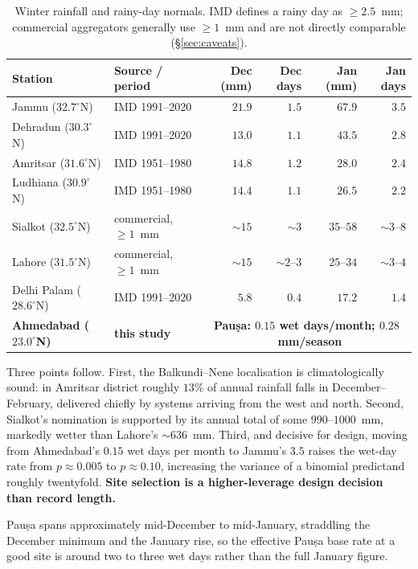\documentclass[11pt,a4paper]{article}
\begin{document}
\begin{table}[H]\centering\small
\caption{Winter rainfall and rainy-day normals. IMD defines a rainy day as $\ge2.5$~mm; commercial aggregators generally use $\ge1$~mm and are not directly comparable (\S\ref{sec:caveats}).}
\label{tab:base}
\begin{tabular}{llrrrr}
\toprule
Station & Source / period & Dec (mm) & Dec days & Jan (mm) & Jan days\\
\midrule
Jammu ($32.7^\circ$N) & IMD 1991--2020 & $21.9$ & $1.5$ & $67.9$ & $\mathbf{3.5}$\\
Dehradun ($30.3^\circ$N) & IMD 1991--2020 & $13.0$ & $1.1$ & $43.5$ & $2.8$\\
Amritsar ($31.6^\circ$N) & IMD 1951--1980 & $14.8$ & $1.2$ & $28.0$ & $2.4$\\
Ludhiana ($30.9^\circ$N) & IMD 1951--1980 & $14.4$ & $1.1$ & $26.5$ & $2.2$\\
Sialkot ($32.5^\circ$N) & commercial, $\ge1$~mm & $\sim15$ & $\sim3$ & $35$--$58$ & $\sim3$--$8$\\
Lahore ($31.5^\circ$N) & commercial, $\ge1$~mm & $\sim15$ & $\sim2$--$3$ & $25$--$34$ & $\sim3$--$4$\\
Delhi Palam ($28.6^\circ$N) & IMD 1991--2020 & $5.8$ & $0.4$ & $17.2$ & $1.4$\\
\midrule
\textbf{Ahmedabad ($23.0^\circ$N)} & \textbf{this study} & \multicolumn{4}{c}{\textbf{Pauṣa: $0.15$ wet days/month; $0.28$~mm/season}}\\
\bottomrule
\end{tabular}
\end{table}

Three points follow. First, the Balkundi--Nene localisation is climatologically sound: in Amritsar district roughly $13\%$ of annual rainfall falls in December--February, delivered chiefly by systems arriving from the west and north. Second, Sialkot's nomination is supported by its annual total of some $990$--$1000$~mm, markedly wetter than Lahore's $\sim636$~mm. Third, and decisive for design, moving from Ahmedabad's $0.15$ wet days per month to Jammu's $3.5$ raises the wet-day rate from $p\approx0.005$ to $p\approx0.10$, increasing the variance of a binomial predictand roughly twentyfold. \textbf{Site selection is a higher-leverage design decision than record length.}

Pauṣa spans approximately mid-December to mid-January, straddling the December minimum and the January rise, so the effective Pauṣa base rate at a good site is around two to three wet days rather than the full January figure.
\end{document}
